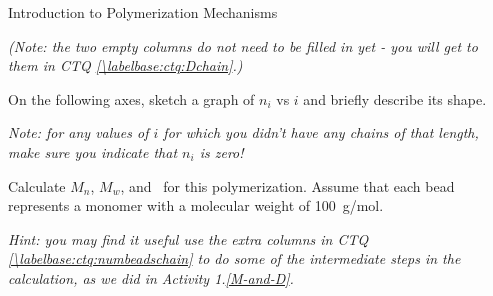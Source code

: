 \begin{activity}{Introduction to Polymerization Mechanisms}
\begin{ctqs}
		\emph{(Note: the two empty columns do not need to be filled in yet - you will get to them in CTQ \ref{\labelbase:ctq:Dchain}.)}
		
	\question On the following axes, sketch a graph of $n_i$ vs $i$ and briefly describe its shape. \label{\labelbase:ctq:MWDchain}
	
		\emph{Note: for any values of $i$ for which you didn't have any chains of that length, make sure you indicate that $n_i$ is zero!}
	
		\begin{solution}[2.5in]\end{solution}
	
	\question Calculate $M_n$, $M_w$, and \PDItext\ for this polymerization.  Assume that each bead represents a monomer with a molecular weight of 100~g/mol. \label{\labelbase:ctq:Dchain}
	
		\emph{Hint: you may find it useful use the extra columns in CTQ \ref{\labelbase:ctq:numbeadschain} to do some of the intermediate steps in the calculation, as we did in Activity 1.\ref{M-and-D}.}
	
		\begin{solution}[2.5in]\end{solution}
	

\end{ctqs}
\end{activity}

